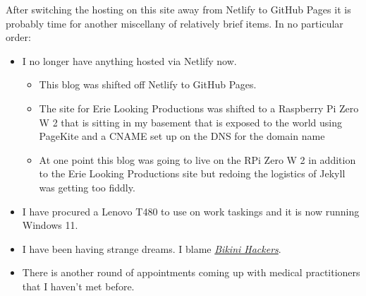 After switching the hosting on this site away from Netlify to GitHub
Pages it is probably time for another miscellany of relatively brief
items. In no particular order:

\begin{itemize}
\tightlist
\item
  I no longer have anything hosted via Netlify now.

  \begin{itemize}
  \tightlist
  \item
    This blog was shifted off Netlify to GitHub Pages.\\
  \item
    The site for Erie Looking Productions was shifted to a Raspberry Pi
    Zero W 2 that is sitting in my basement that is exposed to the world
    using PageKite and a CNAME set up on the DNS for the domain name\\
  \item
    At one point this blog was going to live on the RPi Zero W 2 in
    addition to the Erie Looking Productions site but redoing the
    logistics of Jekyll was getting too fiddly.
  \end{itemize}
\item
  I have procured a Lenovo T480 to use on work taskings and it is now
  running Windows 11.\\
\item
  I have been having strange dreams. I blame
  \href{https://tubitv.com/movies/712905/bikini-hackers?start=false}{\emph{Bikini
  Hackers}}.
\item
  There is another round of appointments coming up with medical
  practitioners that I haven't met before.


\end{itemize}
